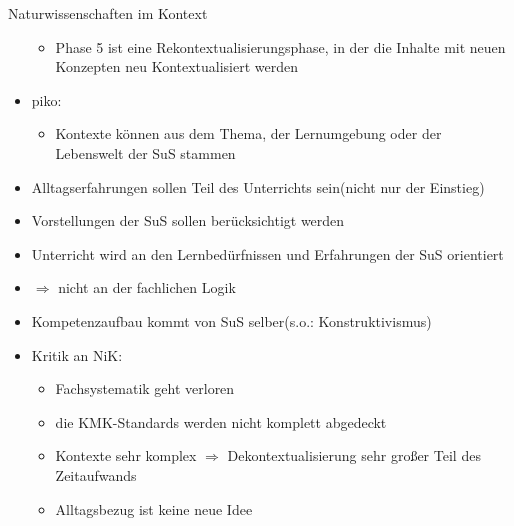 \documentclass{article}
\begin{document}
\begin{block}{Naturwissenschaften im Kontext}
\begin{itemize}
\begin{itemize}
            \item Phase 5 ist eine Rekontextualisierungsphase, in der die Inhalte mit neuen Konzepten neu Kontextualisiert werden
        \end{itemize}
        \item piko:
        \begin{itemize}
            \item Kontexte können aus dem Thema, der Lernumgebung oder der Lebenswelt der SuS stammen
        \end{itemize}
        \item Alltagserfahrungen sollen Teil des Unterrichts sein(nicht nur der Einstieg)
        \item Vorstellungen der SuS sollen berücksichtigt werden
        \item Unterricht wird an den Lernbedürfnissen und Erfahrungen der SuS orientiert
        \item $\Rightarrow$ nicht an der fachlichen Logik
        \item Kompetenzaufbau kommt von SuS selber(s.o.: Konstruktivismus)
        \item Kritik an NiK:
        \begin{itemize}
            \item Fachsystematik geht verloren
            \item die KMK-Standards werden nicht komplett abgedeckt
            \item Kontexte sehr komplex $\Rightarrow$ Dekontextualisierung sehr großer Teil des Zeitaufwands
            \item Alltagsbezug ist keine neue Idee
        \end{itemize}
    \end{itemize}
\end{block}
\end{document}

